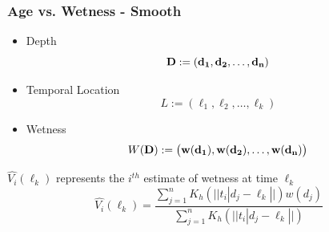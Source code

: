 \documentclass{beamer}
\begin{document}
\begin{frame}
\frametitle{Age vs. Wetness - Smooth}



{\begin{itemize}
	\item Depth $$ \bf D:=(d_1, d_2, \ldots, d_n)$$
	\item Temporal Location $$L := (\ell_1,\ell_2,\ldots, \ell_k)$$
	\item Wetness $$ W \bf (D):=\big(w(d_1), w(d_2) ,\ldots, w(d_n)\big)$$
  \end{itemize}
  $\widehat{V_i}(\ell_k)$ represents the $i^{th}$ estimate of wetness at time $\ell_k$
  $$\widehat{V_i}(\ell_k) = \frac{\sum_{j=1}^{n} K_h(|| t_i|d_j - \ell_k ||) w(d_j)}{\sum_{j=1}^{n} K_h(|| t_i|d_j - \ell_k ||) }$$
  }




\end{frame}
\end{document}
